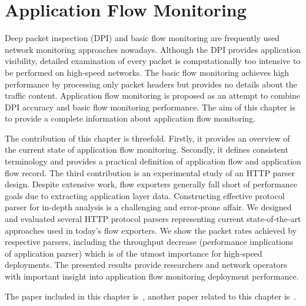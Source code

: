 \chapter{Application Flow Monitoring}

\begin{chapintro}

Deep packet inspection (DPI) and basic flow monitoring are frequently used network monitoring approaches nowadays. Although the DPI provides application visibility, detailed examination of every packet is computationally too intensive to be performed on high-speed networks. The basic flow monitoring achieves high performance by processing only packet headers but provides no details about the traffic content. Application flow monitoring is proposed as an attempt to combine DPI accuracy and basic flow monitoring performance. The aim of this chapter is to provide a complete information about application flow monitoring. 

The contribution of this chapter is threefold. Firstly, it provides an overview of the current state of application flow monitoring. Secondly, it defines consistent terminology and provides a practical definition of application flow and application flow record. The third contribution is an experimental study of an HTTP parser design. Despite extensive work, flow exporters generally fall short of performance goals due to extracting application layer data. Constructing effective protocol parser for in-depth analysis is a challenging and error-prone affair. We designed and evaluated several HTTP protocol parsers representing current state-of-the-art approaches used in today's flow exporters. We show the packet rates achieved by respective parsers, including the throughput decrease (performance implications of application parser) which is of the utmost importance for high-speed deployments. The presented results provide researchers and network operators with important insight into application flow monitoring deployment performance.

The paper included in this chapter is~\cite{Velan-2013-Design}, another paper related to this chapter is~\cite{Velan-2014-Next}.


\end{chapintro}
